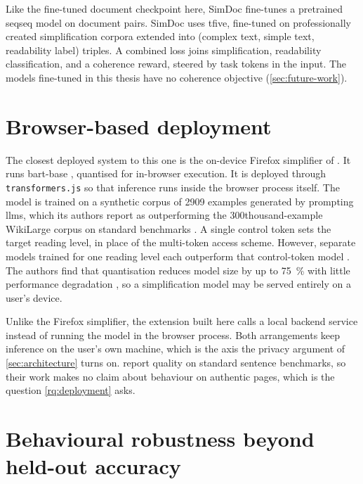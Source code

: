 Like the fine-tuned document checkpoint here, SimDoc \parencite[1, 3]{vasquezrodriguez2024simple} fine-tunes a pretrained \gls{seqseq} model on document pairs.
SimDoc uses \gls{tfive}, fine-tuned on professionally created simplification corpora extended into (complex text, simple text, readability label) triples.
A combined loss joins simplification, readability classification, and a coherence reward, steered by task tokens in the input.
The models fine-tuned in this thesis have no coherence objective (\cref{sec:future-work}).

\pagebreak

\section{Browser-based deployment}
\label{sec:related-browser}

The closest deployed system to this one is the on-device Firefox simplifier of \textcite[105]{romero-etal-2025-efficient}.
It runs \gls{bart}-base \parencite[107]{romero-etal-2025-efficient}, quantised for in-browser execution.
It is deployed through \texttt{transformers.js} so that inference runs inside the browser process itself.
The model is trained on a synthetic corpus of \num{2909} examples generated by prompting \glspl{llm}, which its authors report as outperforming the \num{300}\gls{thousand}-example WikiLarge corpus on standard benchmarks \parencite[105]{romero-etal-2025-efficient}.
A single control token sets the target reading level, in place of the multi-token \gls{access} scheme.
However, separate models trained for one reading level each outperform that control-token model \parencite[110]{romero-etal-2025-efficient}.
The authors find that quantisation reduces model size by up to \qty{75}{\percent} with little performance degradation \parencite[105]{romero-etal-2025-efficient}, so a simplification model may be served entirely on a user's device.

Unlike the Firefox simplifier, the extension built here calls a local backend service instead of running the model in the browser process.
Both arrangements keep inference on the user's own machine, which is the axis the privacy argument of \cref{sec:architecture} turns on.
\textcite{romero-etal-2025-efficient} report quality on standard sentence benchmarks, so their work makes no claim about behaviour on authentic pages, which is the question \cref{rq:deployment} asks.

\section{Behavioural robustness beyond held-out accuracy}
\label{sec:related-robustness}

